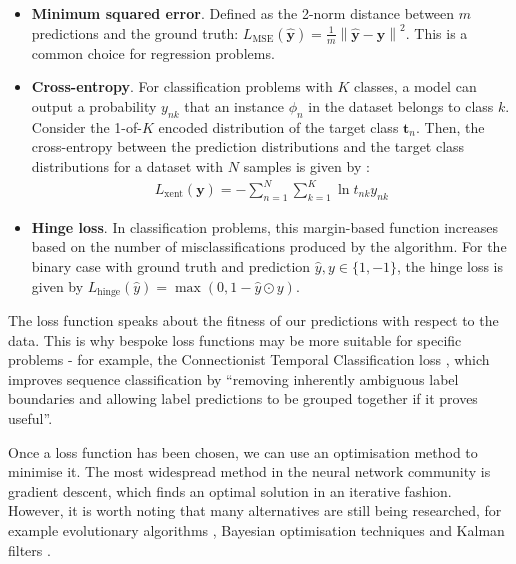 \documentclass[pdftex,12pt,a4paper]{article}
\theoremstyle{definition}
\theoremstyle{remark}
\newcommand*{\V}[1]{\mathbf{#1}}%
\newcommand{\norm}[1]{\left\lVert#1\right\rVert}
\begin{document}
\begin{itemize}
    \item \textbf{Minimum squared error}. Defined as the 2-norm distance between $m$ predictions and the ground truth: $L_\text{MSE}(\hat{\V{y}}) = \frac{1}{m}\norm{\V{\hat{y}} - \V{y}}^2$. This is a common choice for regression problems.
    \item \textbf{Cross-entropy}. For classification problems with $K$ classes, a model can output a probability $y_{nk}$ that an instance $\phi_n$ in the dataset belongs to class $k$. Consider the 1-of-$K$ encoded distribution of the target class $\V{t}_n$. Then, the cross-entropy between the prediction distributions and the target class distributions for a dataset with $N$ samples is given by \cite{Bishop2006}:
    \begin{align*}
        L_{\text{xent}}(\V{y}) = -\sum_{n=1}^N\sum_{k=1}^K\ln t_{nk}{y_{nk}}
    \end{align*}
    
    \item \textbf{Hinge loss}. In classification problems, this margin-based function increases based on the number of misclassifications produced by the algorithm. For the binary case with ground truth and prediction $\hat{y}, y\in\{1, -1\}$, the hinge loss is given by $L_\text{hinge}(\hat{y}) = \max{(0, 1 - \hat{y} \odot y )}$.
\end{itemize}

\par The loss function speaks about the fitness of our predictions with respect to the data. This is why bespoke loss functions may be more suitable for specific problems - for example, the Connectionist Temporal Classification loss \cite{Graves2013}, which improves sequence classification by ``removing inherently ambiguous label boundaries and allowing label predictions to be grouped together if it proves useful''.

\par Once a loss function has been chosen, we can use an optimisation method to minimise it. The most widespread method in the neural network community is gradient descent, which finds an optimal solution in an iterative fashion. However, it is worth noting that many alternatives are still being researched, for example evolutionary algorithms \cite{Sexton1999,Schmidhuber2007}, Bayesian optimisation techniques \cite{Bishop1995} and Kalman filters \cite{Tobergte2013}.
\end{document}
